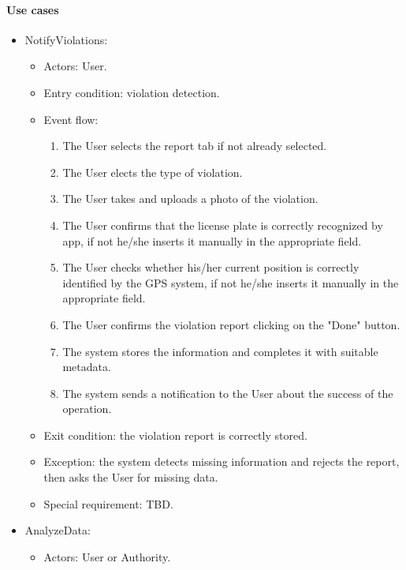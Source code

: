 \paragraph{Use cases}
        \begin{itemize}
            \item NotifyViolations:
            \begin{itemize}
                \item Actors: User.
                \item Entry condition: violation detection.
                \item Event flow:
                \begin{enumerate}
                    \item The User selects the report tab if not already selected.
                    \item The User elects the type of violation.
                    \item The User takes and uploads a photo of the violation.
                    \item The User confirms that the license plate is correctly recognized by app, if not he/she inserts it manually in the appropriate field.
                    \item The User checks whether his/her current position is correctly identified by the GPS system, if not he/she inserts it manually in the appropriate field.
                    \item The User confirms the violation report clicking on the "Done" button.
                    \item The system stores the information and completes it with suitable metadata.
                    \item The system sends a notification to the User about the success of the operation.
                \end{enumerate}
                \item Exit condition: the violation report is correctly stored.
                \item Exception: the system detects missing information and rejects the report, then asks the User for missing data.
                \item Special requirement: TBD.
            \end{itemize}
            \item AnalyzeData:
            \begin{itemize}
                \item Actors: User or Authority.

\end{itemize}
\end{itemize}
